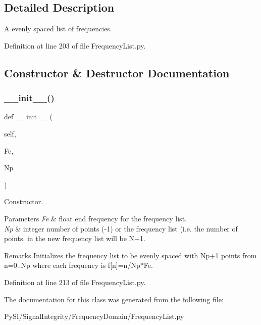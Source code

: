 \subsection{Detailed Description}
A evenly spaced list of frequencies. 

Definition at line 203 of file Frequency\+List.\+py.



\subsection{Constructor \& Destructor Documentation}
\mbox{\label{classSignalIntegrity_1_1FrequencyDomain_1_1FrequencyList_1_1EvenlySpacedFrequencyList_a14670857025f1633a7f1db215d83c385}} 
\subsubsection{\texorpdfstring{\+\_\+\+\_\+init\+\_\+\+\_\+()}{\_\_init\_\_()}}
{\footnotesize\ttfamily def \+\_\+\+\_\+init\+\_\+\+\_\+ (\begin{DoxyParamCaption}\item[{}]{self,  }\item[{}]{Fe,  }\item[{}]{Np }\end{DoxyParamCaption})}



Constructor. 


\begin{DoxyParams}{Parameters}
{\em Fe} & float end frequency for the frequency list. \\
\hline
{\em Np} & integer number of points (-\/1) or the frequency list (i.\+e. the number of points. in the new frequency list will be N+1. \\
\hline
\end{DoxyParams}
\begin{DoxyRemark}{Remarks}
Initializes the frequency list to be evenly spaced with Np+1 points from n=0..Np where each frequency is f\mbox{[}n\mbox{]}=n/\+Np$\ast$\+Fe. 
\end{DoxyRemark}


Definition at line 213 of file Frequency\+List.\+py.



The documentation for this class was generated from the following file\+:\begin{DoxyCompactItemize}
\item 
Py\+S\+I/\+Signal\+Integrity/\+Frequency\+Domain/Frequency\+List.\+py\end{DoxyCompactItemize}
